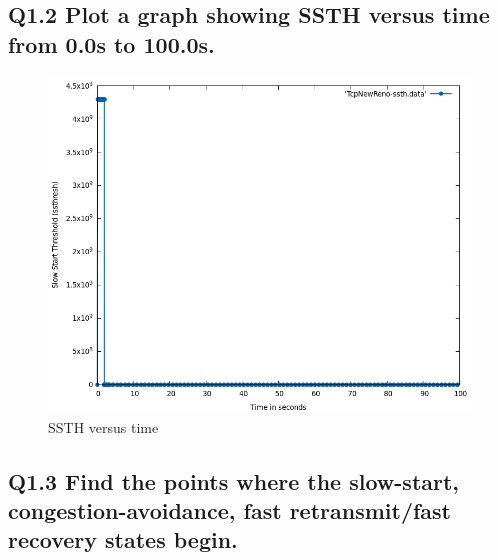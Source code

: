 \documentclass{article}
\begin{document}
\newpage

\subsection{Q1.2 Plot a graph showing SSTH versus time from 0.0s to
100.0s.}

\begin{figure}[h]
    \centering
    \includegraphics[scale=0.5]{images/lab1-group11-task1-question2.png}
    \caption{SSTH versus time}
    \label{fig:q1-2}
\end{figure}

\newpage

\subsection{Q1.3 Find the points where the slow-start,
congestion-avoidance, fast retransmit/fast recovery states begin.}
\end{document}
